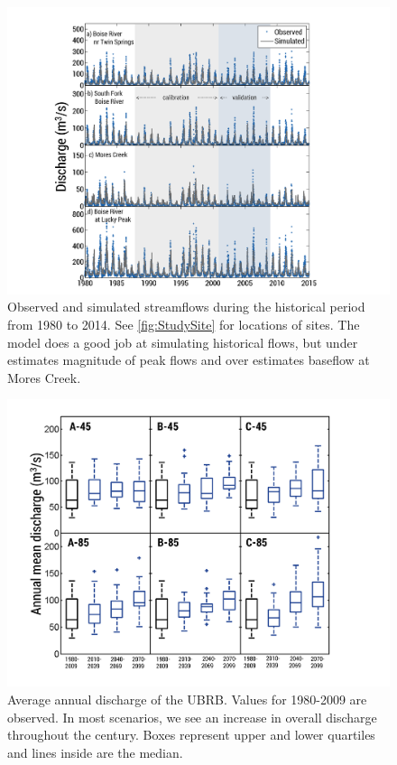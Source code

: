 \documentclass[water,article,submit,moreauthors,pdftex,10pt,a4paper]{mdpi}
\theoremstyle{mdpi}
\newcounter{ex}
\newcounter{re}
\theoremstyle{mdpidefinition}
\begin{document}
\begin{figure}
\centering
\includegraphics[width=\textwidth]{figure-files/figure7.png}
\caption{Observed and simulated streamflows during the historical period from 1980 to 2014. See \cref{fig:StudySite} for locations of sites. The model does a good job at simulating historical flows, but under estimates magnitude of peak flows and over estimates baseflow at Mores Creek.}
\label{fig:CalVal}
\end{figure}
\clearpage

\begin{figure}
\centering
\includegraphics[width=\textwidth]{figure-files/figure8.png}
\caption{Average annual discharge of the UBRB. Values for 1980-2009 are observed. In most scenarios, we see an increase in overall discharge throughout the century. Boxes represent upper and lower quartiles and lines inside are the median.}
\label{fig:BoxPlotDischarge}
\end{figure}
\clearpage
\end{document}
